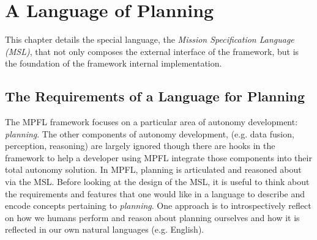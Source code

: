 
\chapter{A Language of Planning}
This chapter details the special language, the \textit{Mission Specification Language (MSL)}, that not only composes the external interface of the framework, but is the foundation of the framework internal implementation.

\section{The Requirements of a Language for Planning}
The MPFL framework focuses on a particular area of autonomy development: \textit{planning}. The other components of autonomy development, (e.g. data fusion, perception, reasoning) are largely ignored though there are hooks in the framework to help a developer using MPFL integrate those components into their total autonomy solution. In MPFL, planning is articulated and reasoned about via the MSL. Before looking at the design of the MSL, it is useful to think about the requirements and features that one would like in a language to describe and encode concepts pertaining to \textit{planning}. One approach is to introspectively reflect on how we humans perform and reason about planning ourselves and how it is reflected in our own natural languages (e.g. English).

